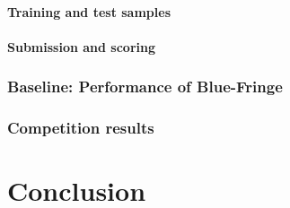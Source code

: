 \documentclass[dvips,a4paper,11pt]{report}
\begin{document}
      \subsubsection*{Training and test samples}
      \subsubsection*{Submission and scoring}
    \subsection{Baseline: Performance of Blue-Fringe\label{subsection_stamina_baseline}}
    \subsection{Competition results\label{subsection_stamina_results}}
\chapter{Conclusion}


\end{document}
